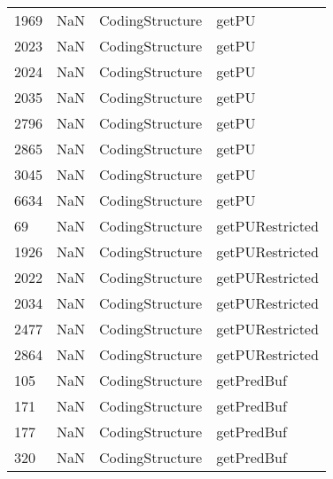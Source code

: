 \begin{tabular}{llll}
1969 &                   NaN &            CodingStructure &                                     getPU \\
2023 &                   NaN &            CodingStructure &                                     getPU \\
2024 &                   NaN &            CodingStructure &                                     getPU \\
2035 &                   NaN &            CodingStructure &                                     getPU \\
2796 &                   NaN &            CodingStructure &                                     getPU \\
2865 &                   NaN &            CodingStructure &                                     getPU \\
3045 &                   NaN &            CodingStructure &                                     getPU \\
6634 &                   NaN &            CodingStructure &                                     getPU \\
69   &                   NaN &            CodingStructure &                           getPURestricted \\
1926 &                   NaN &            CodingStructure &                           getPURestricted \\
2022 &                   NaN &            CodingStructure &                           getPURestricted \\
2034 &                   NaN &            CodingStructure &                           getPURestricted \\
2477 &                   NaN &            CodingStructure &                           getPURestricted \\
2864 &                   NaN &            CodingStructure &                           getPURestricted \\
105  &                   NaN &            CodingStructure &                                getPredBuf \\
171  &                   NaN &            CodingStructure &                                getPredBuf \\
177  &                   NaN &            CodingStructure &                                getPredBuf \\
320  &                   NaN &            CodingStructure &                                getPredBuf \\

\end{tabular}
